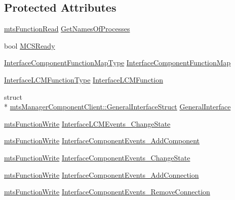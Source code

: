 \subsection*{Protected Attributes}
\begin{DoxyCompactItemize}
\item 
\hyperlink{classmts_function_read}{mts\-Function\-Read} \hyperlink{classmts_manager_component_client_a039ce2594011ffe9d642dc0f57e94862}{Get\-Names\-Of\-Processes}
\item 
bool \hyperlink{classmts_manager_component_client_abb3a505ba4d4fc2ac5f53c4ba4046b8e}{M\-C\-S\-Ready}
\item 
\hyperlink{classmts_manager_component_client_a6f0f9dde52834d02169c3b1feda1cab5}{Interface\-Component\-Function\-Map\-Type} \hyperlink{classmts_manager_component_client_a06b54faafc006ffcdf939c9db5226c6c}{Interface\-Component\-Function\-Map}
\item 
\hyperlink{structmts_manager_component_client_1_1_interface_l_c_m_function_type}{Interface\-L\-C\-M\-Function\-Type} \hyperlink{classmts_manager_component_client_a5ce720ccbed957a6b910e5f2dc27753a}{Interface\-L\-C\-M\-Function}
\item 
struct \\*
\hyperlink{structmts_manager_component_client_1_1_general_interface_struct}{mts\-Manager\-Component\-Client\-::\-General\-Interface\-Struct} \hyperlink{classmts_manager_component_client_a6b305bb0053c9737e4be5fc8b5c76425}{General\-Interface}
\item 
\hyperlink{classmts_function_write}{mts\-Function\-Write} \hyperlink{classmts_manager_component_client_ac4dcfc4dae7e316267a01205ccc05822}{Interface\-L\-C\-M\-Events\-\_\-\-Change\-State}
\item 
\hyperlink{classmts_function_write}{mts\-Function\-Write} \hyperlink{classmts_manager_component_client_a279bf7e8cd30152493fc75be7b4cae60}{Interface\-Component\-Events\-\_\-\-Add\-Component}
\item 
\hyperlink{classmts_function_write}{mts\-Function\-Write} \hyperlink{classmts_manager_component_client_a59623f6dd3cb2dc2ea90c52b97124ef7}{Interface\-Component\-Events\-\_\-\-Change\-State}
\item 
\hyperlink{classmts_function_write}{mts\-Function\-Write} \hyperlink{classmts_manager_component_client_ac15b602cb6ba9d6348a7913c1a22c69d}{Interface\-Component\-Events\-\_\-\-Add\-Connection}
\item 
\hyperlink{classmts_function_write}{mts\-Function\-Write} \hyperlink{classmts_manager_component_client_a59d4a84b08125eae36c441baf236d481}{Interface\-Component\-Events\-\_\-\-Remove\-Connection}
\end{DoxyCompactItemize}
